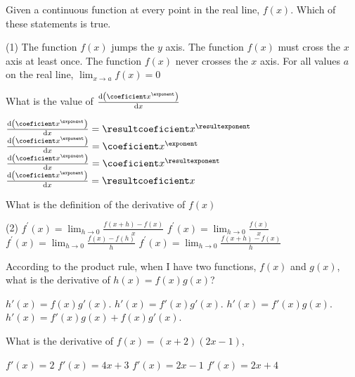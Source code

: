 \documentclass[12pt, noquestionbreak, flushbottom, customfontpath=../Fonts/]{../skrexam}  %
\begin{document}
\begin{questions}

	\question Given a continuous function at every point in the real line, $f(x)$. Which of these statements is true. 
	\begin{choices}(1)
		\choice The function $f(x)$ jumps the $y$ axis.
		\choice The function $f(x)$ must cross the $x$ axis at least once.
		\choice The function $f(x)$ never crosses the $x$ axis.
		\choice\CorrectChoice For all values $a$ on the real line, $ \lim_{x \to a}f(x)  = 0$
	\end{choices}
	

	
\question 
	\pgfmathtruncatemacro{\resultcoeficient}{\coeficient*\exponent}
	What is the value of $\dv{\qty(\coeficient x^{\exponent})}{x}$
	\begin{choices}
		\choice\CorrectChoice $\dv{\qty(\coeficient x^{\exponent})}{x} = \resultcoeficient x^{\resultexponent}$
		\choice $\dv{\qty(\coeficient x^{\exponent})}{x} = \coeficient x^{\exponent}$
		\choice $\dv{\qty(\coeficient x^{\exponent})}{x} = \coeficient x^{\resultexponent}$
		\choice $\dv{\qty(\coeficient x^{\exponent})}{x} = \resultcoeficient x$
	\end{choices}

\question What is the definition of the derivative of $f(x)$
 	\begin{choices}(2)
	\choice $\displaystyle f^\prime(x) = \lim_{h \to 0} \frac{f(x+h)-f(x)}{x}$	
	\choice $\displaystyle f^\prime(x) = \lim_{h \to 0} \frac{f(x)}{x}$
	\choice $\displaystyle f^\prime(x) = \lim_{h \to 0} \frac{f(x) - f(h)}{h}$
 	\choice\CorrectChoice $\displaystyle f^\prime(x) = \lim_{h \to 0} \frac{f(x+h)-f(x)}{h}$
 	\end{choices}

	\question According to the product rule, when I have two functions, $f(x)$ and $g(x)$, what is the derivative of $h(x) = f(x) g(x)$?
	\begin{choices}
		\choice $h'(x) = f(x) g '(x)$.
		\choice $h'(x) = f'(x) g '(x)$.
		\choice $h'(x) = f'(x) g(x)$.
		\choice\CorrectChoice $h'(x) = f'(x) g(x)+ f(x) g '(x)$.
	\end{choices}


	\question What is the derivative of  $f(x) = (x + 2)(2x- 1)$,
	\begin{choices}
		\choice $f'(x) = 2$
		\choice\CorrectChoice $f'(x) = 4 x + 3$
		\choice $f'(x) = 2x - 1$
		\choice $f'(x) = 2x + 4$
	\end{choices}





\end{questions}
\end{document}

